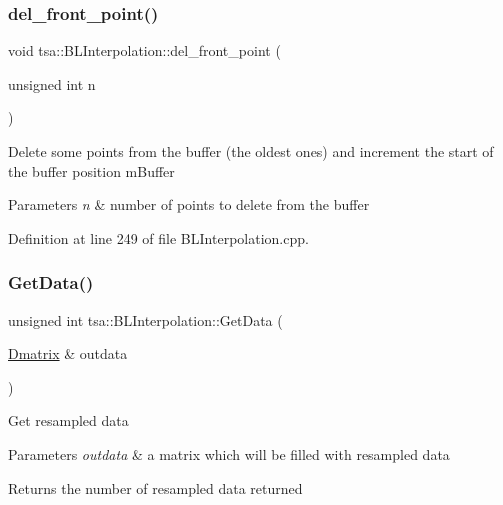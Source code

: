 \subsubsection{\texorpdfstring{del\+\_\+front\+\_\+point()}{del\_front\_point()}}
{\footnotesize\ttfamily void tsa\+::\+B\+L\+Interpolation\+::del\+\_\+front\+\_\+point (\begin{DoxyParamCaption}\item[{unsigned int}]{n }\end{DoxyParamCaption})\hspace{0.3cm}{\ttfamily [private]}}

Delete some points from the buffer (the oldest ones) and increment the start of the buffer position m\+Buffer


\begin{DoxyParams}{Parameters}
{\em n} & number of points to delete from the buffer \\
\hline
\end{DoxyParams}


Definition at line 249 of file B\+L\+Interpolation.\+cpp.

\mbox{\label{classtsa_1_1_b_l_interpolation_a30ed4268c0691edf852ddb3c2ce541c7}} 
\subsubsection{\texorpdfstring{Get\+Data()}{GetData()}}
{\footnotesize\ttfamily unsigned int tsa\+::\+B\+L\+Interpolation\+::\+Get\+Data (\begin{DoxyParamCaption}\item[{\hyperlink{namespacetsa_ad260cd21c1891c4ed391fe788569aba4}{Dmatrix} \&}]{outdata }\end{DoxyParamCaption})}

Get resampled data


\begin{DoxyParams}{Parameters}
{\em outdata} & a matrix which will be filled with resampled data\\
\hline
\end{DoxyParams}
\begin{DoxyReturn}{Returns}
the number of resampled data returned 
\end{DoxyReturn}


